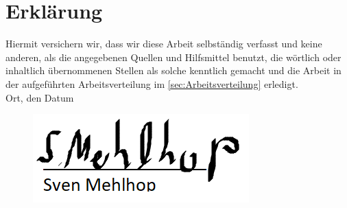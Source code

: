 \section{Erklärung}

Hiermit versichern wir, dass wir diese Arbeit selbständig verfasst und keine anderen, als die angegebenen Quellen und Hilfsmittel benutzt, die wörtlich oder inhaltlich übernommenen Stellen als solche kenntlich gemacht und die Arbeit in der aufgeführten Arbeitsverteilung im \autoref{sec:Arbeitsverteilung} erledigt. \\[2ex] 

\noindent
Ort, den Datum\\[5ex]

\begin{figure}[H]
	\includegraphics{Anhang/Unterschriften.png}%
\end{figure}
